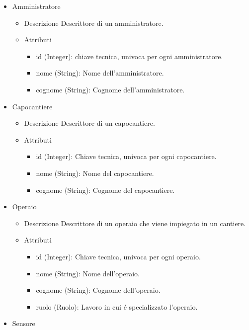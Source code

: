 \documentclass[11pt]{article}
\begin{document}
\begin{itemize}
\begin{itemize}
\begin{itemize}
\end{itemize}
\end{itemize}
\item Amministratore
\label{sec:org71d3cb2}
\begin{itemize}
\item Descrizione
\label{sec:orge16225d}
Descrittore di un amministratore.
\item Attributi
\label{sec:orga5d23b1}
\begin{itemize}
\item id (Integer): chiave tecnica, univoca per ogni amministratore.
\item nome (String): Nome dell'amministratore.
\item cognome (String): Cognome dell'amministratore.
\end{itemize}
\end{itemize}
\item Capocantiere
\label{sec:orgc406290}
\begin{itemize}
\item Descrizione
\label{sec:org6ff6899}
Descrittore di un capocantiere.
\item Attributi
\label{sec:org1b2c89d}
\begin{itemize}
\item id (Integer): Chiave tecnica, univoca per ogni capocantiere.
\item nome (String): Nome del capocantiere.
\item cognome (String): Cognome del capocantiere.
\end{itemize}
\end{itemize}
\item Operaio
\label{sec:org01911e6}
\begin{itemize}
\item Descrizione
\label{sec:org7adc824}
Descrittore di un operaio che viene impiegato in un cantiere.
\item Attributi
\label{sec:orgc55bbd8}
\begin{itemize}
\item id (Integer): Chiave tecnica, univoca per ogni operaio.
\item nome (String): Nome dell'operaio.
\item cognome (String): Cognome dell'operaio.
\item ruolo (Ruolo): Lavoro in cui é specializzato l'operaio.
\end{itemize}
\end{itemize}
\item Sensore

\end{itemize}
\end{document}
